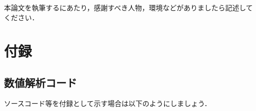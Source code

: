 \documentclass[12pt]{kupaper}
\begin{document}
\begin{thanks}
	本論文を執筆するにあたり，感謝すべき人物，環境などがありましたら記述してください．
\end{thanks}

\appendix
\chapter*{付録} %

\section{数値解析コード}
ソースコード等を付録として示す場合は以下のようにしましょう．


\printbibliography[title=参考文献]
\end{document}
